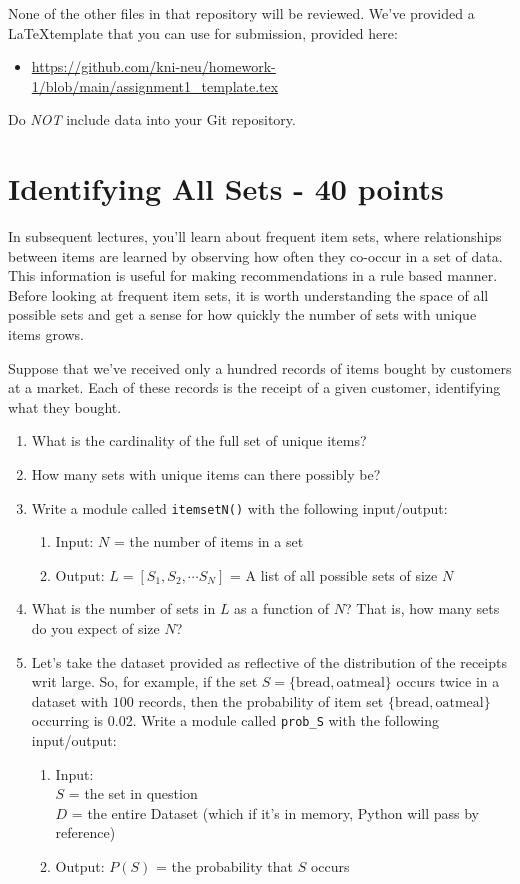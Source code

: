 \documentclass[paper=a4, fontsize=11pt]{scrartcl} %
\numberwithin{equation}{section} %
\numberwithin{figure}{section} %
\numberwithin{table}{section} %
\begin{document}
None of the other files in that repository will be reviewed. We've provided a \LaTeX template that you can use for submission, provided here:
\begin{itemize}
    \item \url{https://github.com/kni-neu/homework-1/blob/main/assignment1_template.tex}
\end{itemize}

Do \emph{NOT} include data into your Git repository.

\section{Identifying All Sets - 40 points}

In subsequent lectures, you'll learn about frequent item sets, where relationships between items are learned by observing how often they co-occur in a set of data. This information is useful for making recommendations in a rule based manner. Before looking at frequent item sets, it is worth understanding the space of all possible sets and get a sense for how quickly the number of sets with unique items grows.

Suppose that we've received only a hundred records of items bought by customers at a market. Each of these records is the receipt of a given customer, identifying what they bought.

\begin{enumerate}
    \item What is the cardinality of the full set of unique items?
    \item How many sets with unique items can there possibly be?
    \item Write a module called \verb"itemsetN()" with the following input/output:
      \begin{enumerate}
      \item Input: $N$ = the number of items in a set
      \item Output: $L = [ S_1, S_2, \cdots S_N ]$ = A list of all possible sets of size $N$
      \end{enumerate}
    \item What is the number of sets in $L$ as a function of $N$? That is, how many sets do you expect of size $N$?
    \item Let's take the dataset provided as reflective of the distribution of the receipts writ large. So, for example, if the set $S= \{ \text{bread}, \text{oatmeal}\}$ occurs twice in a dataset with $100$ records, then the probability of item set $\{ \text{bread}, \text{oatmeal} \}$ occurring is 0.02. Write a module called \verb"prob_S" with the following input/output:
      \begin{enumerate}
      \item Input: \\ $S$ = the set in question \\ $D$ = the entire Dataset (which if it's in memory, Python will pass by reference)
      \item Output: $P(S)$ = the probability that $S$ occurs
      \end{enumerate}
\end{enumerate}
\end{document}
